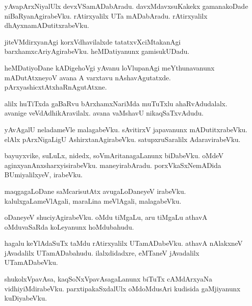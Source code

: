 \documentclass{article}
\begin{document}
\begin{mn}
yAvapArxNiyalUlx devxVSamADabAradu. davxMdavxsuKakekx gamanakoDade niBaRyanAgirabeVku. rAtirxyalilx 
UTa mADabAradu. rAtirxyalilx dhAyxnamADutitxrabeVku.
\end{mn}

\begin{mn}
jiteVMdirxyanAgi korxVdhavilalxde tatatxvXciMtakanAgi barxhamxcAriyAgirabeVku. heMDatiyanunx 
gamisukUDadu.
\end{mn}

\begin{mn}
heMDatiyoDane kADigehoVgi yAvanu loVlupanAgi meYthunavanunx mADutAtxneyoV avana A varxtavu 
nAshavAgutatxde. pArxyashicxtAtxhaRnAgutAtxne.
\end{mn}

\begin{mn}
alilx huTiTxda gaBaRvu bArxhamxNariMda muTuTxlu ahaRvAdudalalx. avanige veVdAdhikAravilalx. avana 
vaMshavU nikaqSaTxvAdudu.
\end{mn}

\begin{mn}
yAvAgalU neladameVle malagabeVku. sAvitirxV japavanunx mADutitxrabeVku. elAlx pArxNigaLigU 
AshirxtanAgirabeVku. satupxruSaralilx AdaravirabeVku.
\end{mn}

\begin{mn}
bayuyxvike, suLuLx, nidedx, soVmAritanagaLanunx biDabeVku. oMdeV aginxyanAnxsharxyisirabeVku. 
maneyirabAradu. porxVkaSxNemADida BUmiyalilxyeV, irabeVku.
\end{mn}

\begin{mn}
maqgagaLoDane saMcarisutAtx avugaLoDaneyeV irabeVku. kalulxgaLameVlAgali, maraLina meVlAgali, 
malagabeVku.
\end{mn}

\begin{mn}
oDaneyeV shuciyAgirabeVku. oMdu tiMgaLu, aru tiMgaLu athavA oMduvaSaRda koLeyanunx hoMdubahudu.
\end{mn}

\begin{mn}
hagalu keYlAdaSuTx taMdu rAtirxyalilx UTamADabeVku. athavA nAlakxneV jAvadalilx UTamADabahudu. 
ilalxdidadxre, eMTaneV jAvadalilx UTamADabeVku.
\end{mn}

\begin{mn}
shukolxVpavAsa, kaqSoNxVpavAsagaLanunx biTuTx cAMdArxyaNa vidhiyiMdirabeVku. parxtipakaSxdalUlx 
oMdoMdusAri kudisida gaMjiyanunx kuDiyabeVku.
\end{mn}
\end{document}
